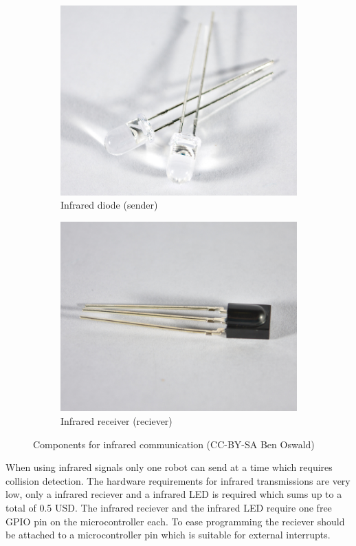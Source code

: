 \begin{figure}[H]
  \centering
  \begin{subfigure}{0.48\textwidth}
  \centering
  \includegraphics[width=0.9\linewidth]{images/30_irdiodes.jpg}
  \caption{Infrared diode (sender)}
  \end{subfigure}
  \begin{subfigure}{0.48\textwidth}
  \centering
  \includegraphics[width=0.9\linewidth]{images/30_ir.jpg}
  \caption{Infrared receiver (reciever)}
  \end{subfigure}
  \caption{Components for infrared communication (CC-BY-SA Ben Oswald)}
\end{figure}

When using infrared signals only one robot can send at a time which requires collision detection. The hardware requirements for infrared transmissions are very low, only a infrared reciever and a infrared LED is required which sums up to a total of 0.5 USD. The infrared reciever and the infrared LED require one free GPIO pin on the microcontroller each. To ease programming the reciever should be attached to a microcontroller pin which is suitable for external interrupts.

